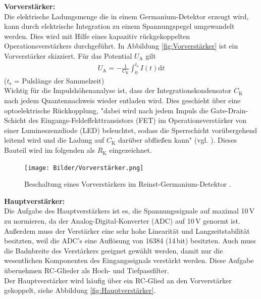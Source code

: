 \textbf{Vorverstärker:} \\
Die elektrische Ladungsmenge die in einem Germanium-Detektor erzeugt wird, kann durch elektrische Integration zu einem Spannungspegel umgewandelt werden. Dies wird mit Hilfe eines kapazitiv rückgekoppelten Operationsverstärkers durchgeführt. In Abbildung \eqref{fig:Vorverstärker} ist ein Vorverstärker skizziert. Für das Potential $U_\text{A}$ gilt
\begin{align}
  U_\text{A} = - \frac{1}{C_\text{K}} \int_{0}^{t_\text{s}} I(t) \text{d}t
\end{align}
\hfil {\footnotesize($t_\text{s}$ = Pulslänge der Sammelzeit)} \hfil \\

Wichtig für die Impulshöhenanalyse ist, dass der Integrationskondensator $C_\text{K}$ nach jedem Quantennachweis wieder entladen wird. Dies geschieht über eine optoelektrische Rückkopplung, "dabei wird nach jedem Impuls die Gate-Drain-Schicht des Eingangs-Feldeffekttransistors (FET) im Operationsverstärker von einer Lumineszenzdiode (LED) beleuchtet, sodass die Sperrschicht vorübergehend leitend wird und die Ladung auf $C_\text{K}$ darüber abfließen kann" (vgl. \cite[18]{V18}). Dieses Bauteil wird im folgenden als $R_\text{K}$ eingezeichnet.

\begin{figure}[H]
  \centering
  \texttt{[image: Bilder/Vorverstärker.png]}
  \caption{Beschaltung eines Vorverstärkers im Reinst-Germanium-Detektor \cite{V18}.}
  \label{fig:Vorverstärker}
\end{figure}

\textbf{Hauptverstärker:} \\
Die Aufgabe des Hauptverstärkers ist es, die Spannungssignale auf maximal 10\,V zu normieren, da der Analog-Digital-Konverter (ADC) auf 10\,V genormt ist. Außerdem muss der Verstärker eine sehr hohe Linearität und Langzeitstabilität besitzten, weil die ADC's eine Auflösung von 16384 (14\,bit) besitzten. Auch muss die Badnbreite des Verstärkers geeignet gewählt werden, damit nur die wesentlichen Komponenten des Eingangssignals verstärkt werden. Diese Aufgabe übernehmen RC-Glieder als Hoch- und Tiefpassfilter. \\
Der Hauptverstärker wird häufig über ein RC-Glied an den Vorverstärker gekoppelt, siehe Abbildung \eqref{fig:Hauptverstärker}.

